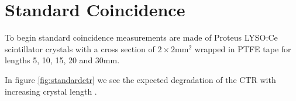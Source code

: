 \section{Standard Coincidence}
To begin standard coincidence measurements are made of Proteus LYSO:Ce scintillator crystals with a cross section of $2\times2$mm$^2$ wrapped in PTFE tape for lengths 5, 10, 15, 20 and 30mm. 


In figure \ref{fig:standardctr} we see the expected degradation of the CTR with increasing crystal length \cite{r_Paganoni_Pauwels_et_al__2011}\cite{Wiener_Kaul_Surti_Karp_2010}\cite{Choong_2009}\cite{Gola_Piemonte_Tarolli_2013}\cite{o_Pro_Serra_Tarolli_Zorzi_2011}.